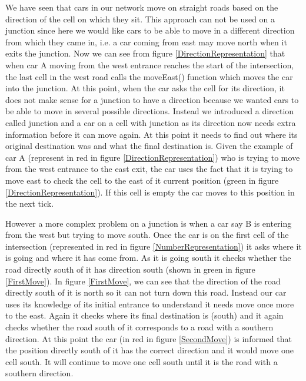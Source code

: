 \documentclass{article}
\begin{document}
We have seen that cars in our network move on straight roads based on the direction of the cell on which  they sit. This approach can not be used on a junction since here we would like cars to be able to move in a different direction from which they came in, i.e. a car coming from east may move north when it exits the junction. Now we can see from figure \ref{DirectionRepresentation} that when car A moving from the west entrance reaches the start of the intersection, the last cell in the west road calls the moveEast() function which moves the car into the junction. At this point, when the car asks the cell for its direction, it does not make sense for a junction to have a direction because we wanted cars to be able to move in several possible directions. Instead we introduced a direction called junction and a car on a cell with junction as its direction now needs extra information before it can move again. At this point it needs to find out where its original destination was and what the final destination is. Given the example of car A (represent in red in figure \ref{DirectionRepresentation}) who is trying to move from the west entrance to the east exit, the car uses the fact that it is trying to move east to check the cell to the east of it current position (green in figure \ref{DirectionRepresentation}). If this cell is empty the car moves to this position in the next tick. 

However a more complex problem on a junction is when a car say B is entering from the west but trying to move south. Once the car is on the first cell of the intersection (represented in red in figure \ref{NumberRepresentation}) it asks where it is going and where it has come from. As it is going south it checks whether the road directly south of it has direction south (shown in green in figure \ref{FirstMove}). In figure \ref{FirstMove}, we can see that the direction of the road directly south of it is north so it can not turn down this road. Instead our car uses its knowledge of its initial entrance to understand it needs move once more to the east. Again it checks where its final destination is (south) and it again checks whether the road south of it corresponds to a road with a southern direction. At this point the car (in red in figure \ref{SecondMove}) is informed that the position directly south of it has the correct direction and it would move one cell south. It will continue to move one cell south until it is the road with a southern direction. 
\end{document}
